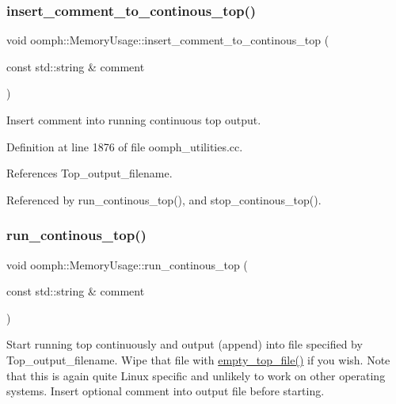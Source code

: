 \subsubsection{\texorpdfstring{insert\+\_\+comment\+\_\+to\+\_\+continous\+\_\+top()}{insert\_comment\_to\_continous\_top()}}
{\footnotesize\ttfamily void oomph\+::\+Memory\+Usage\+::insert\+\_\+comment\+\_\+to\+\_\+continous\+\_\+top (\begin{DoxyParamCaption}\item[{const std\+::string \&}]{comment }\end{DoxyParamCaption})}



Insert comment into running continuous top output. 



Definition at line 1876 of file oomph\+\_\+utilities.\+cc.



References Top\+\_\+output\+\_\+filename.



Referenced by run\+\_\+continous\+\_\+top(), and stop\+\_\+continous\+\_\+top().

\mbox{\label{namespaceoomph_1_1MemoryUsage_a53c2afeb4ffd85dd771ace27fcb84136}} 
\subsubsection{\texorpdfstring{run\+\_\+continous\+\_\+top()}{run\_continous\_top()}}
{\footnotesize\ttfamily void oomph\+::\+Memory\+Usage\+::run\+\_\+continous\+\_\+top (\begin{DoxyParamCaption}\item[{const std\+::string \&}]{comment }\end{DoxyParamCaption})}



Start running top continuously and output (append) into file specified by Top\+\_\+output\+\_\+filename. Wipe that file with \hyperlink{namespaceoomph_1_1MemoryUsage_a0034019640ac5f6ffe7e8e40fae1e453}{empty\+\_\+top\+\_\+file()} if you wish. Note that this is again quite Linux specific and unlikely to work on other operating systems. Insert optional comment into output file before starting. 

